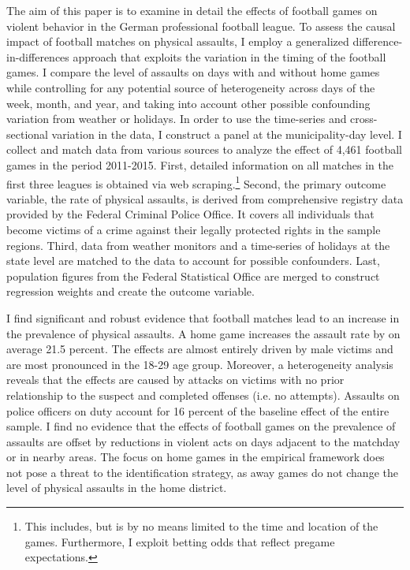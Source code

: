 The aim of this paper is to examine in detail the effects of football games on violent behavior in the German professional football league. To assess the causal impact of football matches on physical assaults, I employ a generalized difference-in-differences approach that exploits the variation in the timing of the football games. I compare the level of assaults on days with and without home games while controlling for any potential source of heterogeneity across days of the week, month, and year, and taking into account other possible confounding variation from weather or holidays. In order to use the time-series and cross-sectional variation in the data, I construct a panel at the municipality-day level. I collect and match data from various sources to analyze the effect of 4,461 football games in the period 2011-2015. First, detailed information on all matches in the first three leagues is obtained via web scraping.\footnote{This includes, but is by no means limited to the time and location of the games. Furthermore, I exploit betting odds that reflect pregame expectations.} Second, the primary outcome variable, the rate of physical assaults, is derived from comprehensive registry data provided by the Federal Criminal Police Office. It covers all individuals that become victims of a crime against their legally protected rights in the sample regions. Third, data from weather monitors and a time-series of holidays at the state level are matched to the data to account for possible confounders. Last, population figures from the Federal Statistical Office are merged to construct regression weights and create the outcome variable. 



I find significant and robust evidence that football matches lead to an increase in the prevalence of physical assaults. A home game increases the assault rate by on average 21.5 percent. The effects are almost entirely driven by male victims and are most pronounced in the 18-29 age group. Moreover, a heterogeneity analysis reveals that the effects are caused by attacks on victims with no prior relationship to the suspect and completed offenses (i.e. no attempts). Assaults on police officers on duty account for 16 percent of the baseline effect of the entire sample. I find no evidence that the effects of football games on the prevalence of assaults are offset by reductions in violent acts on days adjacent to the matchday or in nearby areas. The focus on home games in the empirical framework does not pose a threat to the identification strategy, as away games do not change the level of physical assaults in the home district.



